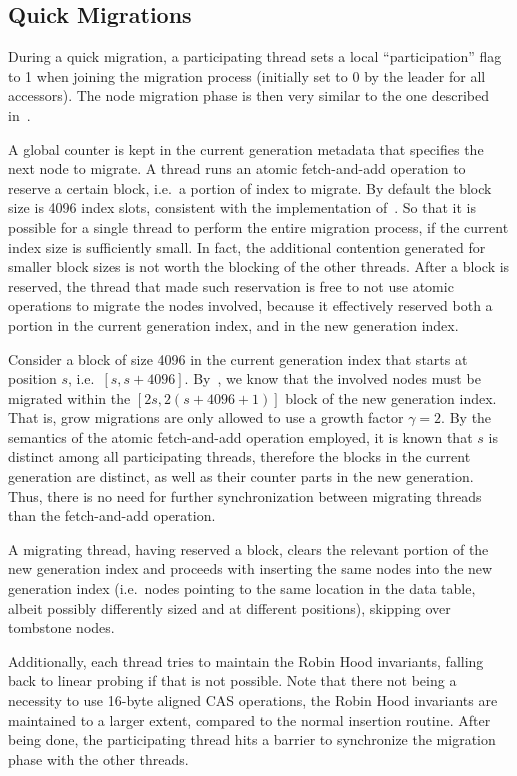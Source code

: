 \subsection{Quick Migrations}\label{subsec:quick-migrations}

During a quick migration, a participating thread sets a local ``participation'' flag to 1 when joining the migration process (initially set to 0 by the leader for all accessors).
The node migration phase is then very similar to the one described in~\cite[\S5.3.1]{maier}.

A global counter is kept in the current generation metadata that specifies the next node to migrate.
A thread runs an atomic fetch-and-add operation to reserve a certain block, i.e.\ a portion of index to migrate.
By default the block size is 4096 index slots, consistent with the implementation of~\cite{maier}.
So that it is possible for a single thread to perform the entire migration process, if the current index size is sufficiently small.
In fact, the additional contention generated for smaller block sizes is not worth the blocking of the other threads.
After a block is reserved, the thread that made such reservation is free to not use atomic operations to migrate the nodes involved, because it effectively reserved both a portion in the current generation index, and in the new generation index.

Consider a block of size 4096 in the current generation index that starts at position $s$, i.e.\ $[s, s + 4096]$.
By~\cite[Lemma~5.1]{maier}, we know that the involved nodes must be migrated within the $[2s, 2(s + 4096 + 1)]$ block of the new generation index.
That is, grow migrations are only allowed to use a growth factor $\gamma = 2$.
By the semantics of the atomic fetch-and-add operation employed, it is known that $s$ is distinct among all participating threads, therefore the blocks in the current generation are distinct, as well as their counter parts in the new generation.
Thus, there is no need for further synchronization between migrating threads than the fetch-and-add operation.

A migrating thread, having reserved a block, clears the relevant portion of the new generation index and proceeds with inserting the same nodes into the new generation index (i.e.\ nodes pointing to the same location in the data table, albeit possibly differently sized and at different positions), skipping over tombstone nodes.

Additionally, each thread tries to maintain the Robin Hood invariants, falling back to linear probing if that is not possible.
Note that there not being a necessity to use 16-byte aligned CAS operations, the Robin Hood invariants are maintained to a larger extent, compared to the normal insertion routine.
After being done, the participating thread hits a barrier to synchronize the migration phase with the other threads.


